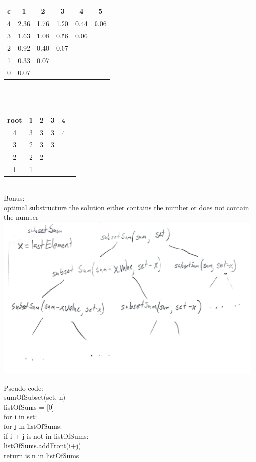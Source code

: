 \documentclass{article}
\begin{document}
\begin{tabular}{ c | c | c | c | c | c}         
c & 1 & 2 & 3 & 4 & 5 \\ 
\hline 4 & 2.36 & 1.76 & 1.20 & 0.44 & 0.06 \\  
\hline 3 & 1.63 & 1.08 & 0.56 & 0.06 \\
\hline 2 & 0.92 & 0.40 & 0.07 \\
\hline 1 & 0.33 & 0.07 \\   
\hline 0 & 0.07     
\end{tabular}
\\ \\
\begin{tabular}{ c | c | c | c | c | c}         
root & 1 & 2 & 3 & 4  \\ 
\hline 4    & 3 & 3 & 3 & 4 \\  
\hline 3    & 2 & 3 & 3 \\
\hline 2    & 2 & 2 \\
\hline 1    & 1 \\   
\end{tabular}
\\
Bonus:\\
optimal substructure the solution either contains the number or does not contain the number\\
\includegraphics[scale=0.25]{graph.png}

Pseudo code: \\ 
sumOfSubset(set, n) {\\
\indent listOfSums = [0]\\
\indent for i in set:\\
\indent \indent for j in listOfSums:\\
\indent \indent \indent if i + j is not in listOfSums:\\
\indent\indent\indent\indent listOfSums.addFront(i+j)\\
\indent return is n in listOfSums\\
}
\end{document}
